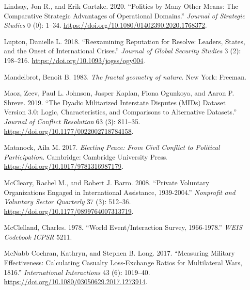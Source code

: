 \documentclass{article}
\newlength{\cslhangindent}
\newlength{\cslentryspacingunit} %
\newenvironment{CSLReferences}[2] %
 {%
  \setlength{\parindent}{0pt}
  \ifodd #1
  \let\oldpar\par
  \def\par{\hangindent=\cslhangindent\oldpar}
  \fi
  \setlength{\parskip}{#2\cslentryspacingunit}
 }%
 {}
\begin{document}
\begin{CSLReferences}{1}{0}
\leavevmode{}%
Lindsay, Jon R., and Erik Gartzke. 2020. {``Politics by Many Other
Means: {The} Comparative Strategic Advantages of Operational Domains.''}
\emph{Journal of Strategic Studies} 0 (0): 1--34.
\url{https://doi.org/10.1080/01402390.2020.1768372}.

\leavevmode{}%
Lupton, Danielle L. 2018. {``Reexamining {Reputation} for {Resolve}:
{Leaders}, {States}, and the {Onset} of {International Crises}.''}
\emph{Journal of Global Security Studies} 3 (2): 198--216.
\url{https://doi.org/10.1093/jogss/ogy004}.

\leavevmode{}%
Mandelbrot, Benoit B. 1983. \emph{{The fractal geometry of nature}}.
{New York}: {Freeman}.

\leavevmode{}%
Maoz, Zeev, Paul L. Johnson, Jasper Kaplan, Fiona Ogunkoya, and Aaron P.
Shreve. 2019. {``The {Dyadic Militarized Interstate Disputes} ({MIDs})
{Dataset Version} 3.0: {Logic}, {Characteristics}, and {Comparisons} to
{Alternative Datasets}.''} \emph{Journal of Conflict Resolution} 63 (3):
811--35. \url{https://doi.org/10.1177/0022002718784158}.

\leavevmode{}%
Matanock, Aila M. 2017. \emph{Electing {Peace}: {From Civil Conflict} to
{Political Participation}}. {Cambridge}: {Cambridge University Press}.
\url{https://doi.org/10.1017/9781316987179}.

\leavevmode{}%
McCleary, Rachel M., and Robert J. Barro. 2008. {``Private {Voluntary
Organizations Engaged} in {International Assistance}, 1939-2004.''}
\emph{Nonprofit and Voluntary Sector Quarterly} 37 (3): 512--36.
\url{https://doi.org/10.1177/0899764007313719}.

\leavevmode{}%
McClelland, Charles. 1978. {``World Event/Interaction Survey,
1966-1978.''} \emph{WEIS Codebook ICPSR} 5211.

\leavevmode{}%
McNabb Cochran, Kathryn, and Stephen B. Long. 2017. {``Measuring
{Military Effectiveness}: {Calculating Casualty Loss-Exchange Ratios}
for {Multilateral Wars}, 1816.''} \emph{International
Interactions} 43 (6): 1019--40.
\url{https://doi.org/10.1080/03050629.2017.1273914}.


\end{CSLReferences}
\end{document}
